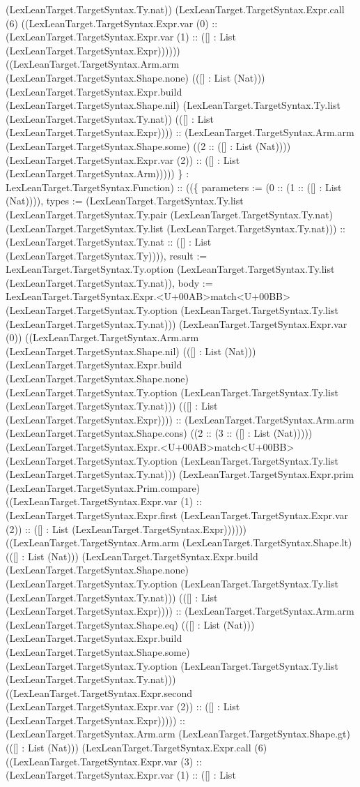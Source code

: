 \documentclass[11pt]{article}
\begin{document}
(LexLeanTarget.TargetSyntax.Ty.nat)) (LexLeanTarget.TargetSyntax.Expr.call (6) ((LexLeanTarget.TargetSyntax.Expr.var (0) :: (LexLeanTarget.TargetSyntax.Expr.var (1) :: ([] : List (LexLeanTarget.TargetSyntax.Expr)))))) ((LexLeanTarget.TargetSyntax.Arm.arm (LexLeanTarget.TargetSyntax.Shape.none) (([] : List (Nat))) (LexLeanTarget.TargetSyntax.Expr.build (LexLeanTarget.TargetSyntax.Shape.nil) (LexLeanTarget.TargetSyntax.Ty.list (LexLeanTarget.TargetSyntax.Ty.nat)) (([] : List (LexLeanTarget.TargetSyntax.Expr)))) :: (LexLeanTarget.TargetSyntax.Arm.arm (LexLeanTarget.TargetSyntax.Shape.some) ((2 :: ([] : List (Nat)))) (LexLeanTarget.TargetSyntax.Expr.var (2)) :: ([] : List (LexLeanTarget.TargetSyntax.Arm))))) \} : LexLeanTarget.TargetSyntax.Function) :: ((\{ parameters := (0 :: (1 :: ([] : List (Nat)))), types := (LexLeanTarget.TargetSyntax.Ty.list (LexLeanTarget.TargetSyntax.Ty.pair (LexLeanTarget.TargetSyntax.Ty.nat) (LexLeanTarget.TargetSyntax.Ty.list (LexLeanTarget.TargetSyntax.Ty.nat))) :: (LexLeanTarget.TargetSyntax.Ty.nat :: ([] : List (LexLeanTarget.TargetSyntax.Ty)))), result := LexLeanTarget.TargetSyntax.Ty.option (LexLeanTarget.TargetSyntax.Ty.list (LexLeanTarget.TargetSyntax.Ty.nat)), body := LexLeanTarget.TargetSyntax.Expr.<U+00AB>match<U+00BB> (LexLeanTarget.TargetSyntax.Ty.option (LexLeanTarget.TargetSyntax.Ty.list (LexLeanTarget.TargetSyntax.Ty.nat))) (LexLeanTarget.TargetSyntax.Expr.var (0)) ((LexLeanTarget.TargetSyntax.Arm.arm (LexLeanTarget.TargetSyntax.Shape.nil) (([] : List (Nat))) (LexLeanTarget.TargetSyntax.Expr.build (LexLeanTarget.TargetSyntax.Shape.none) (LexLeanTarget.TargetSyntax.Ty.option (LexLeanTarget.TargetSyntax.Ty.list (LexLeanTarget.TargetSyntax.Ty.nat))) (([] : List (LexLeanTarget.TargetSyntax.Expr)))) :: (LexLeanTarget.TargetSyntax.Arm.arm (LexLeanTarget.TargetSyntax.Shape.cons) ((2 :: (3 :: ([] : List (Nat))))) (LexLeanTarget.TargetSyntax.Expr.<U+00AB>match<U+00BB> (LexLeanTarget.TargetSyntax.Ty.option (LexLeanTarget.TargetSyntax.Ty.list (LexLeanTarget.TargetSyntax.Ty.nat))) (LexLeanTarget.TargetSyntax.Expr.prim (LexLeanTarget.TargetSyntax.Prim.compare) ((LexLeanTarget.TargetSyntax.Expr.var (1) :: (LexLeanTarget.TargetSyntax.Expr.first (LexLeanTarget.TargetSyntax.Expr.var (2)) :: ([] : List (LexLeanTarget.TargetSyntax.Expr)))))) ((LexLeanTarget.TargetSyntax.Arm.arm (LexLeanTarget.TargetSyntax.Shape.lt) (([] : List (Nat))) (LexLeanTarget.TargetSyntax.Expr.build (LexLeanTarget.TargetSyntax.Shape.none) (LexLeanTarget.TargetSyntax.Ty.option (LexLeanTarget.TargetSyntax.Ty.list (LexLeanTarget.TargetSyntax.Ty.nat))) (([] : List (LexLeanTarget.TargetSyntax.Expr)))) :: (LexLeanTarget.TargetSyntax.Arm.arm (LexLeanTarget.TargetSyntax.Shape.eq) (([] : List (Nat))) (LexLeanTarget.TargetSyntax.Expr.build (LexLeanTarget.TargetSyntax.Shape.some) (LexLeanTarget.TargetSyntax.Ty.option (LexLeanTarget.TargetSyntax.Ty.list (LexLeanTarget.TargetSyntax.Ty.nat))) ((LexLeanTarget.TargetSyntax.Expr.second (LexLeanTarget.TargetSyntax.Expr.var (2)) :: ([] : List (LexLeanTarget.TargetSyntax.Expr))))) :: (LexLeanTarget.TargetSyntax.Arm.arm (LexLeanTarget.TargetSyntax.Shape.gt) (([] : List (Nat))) (LexLeanTarget.TargetSyntax.Expr.call (6) ((LexLeanTarget.TargetSyntax.Expr.var (3) :: (LexLeanTarget.TargetSyntax.Expr.var (1) :: ([] : List 
\end{document}
